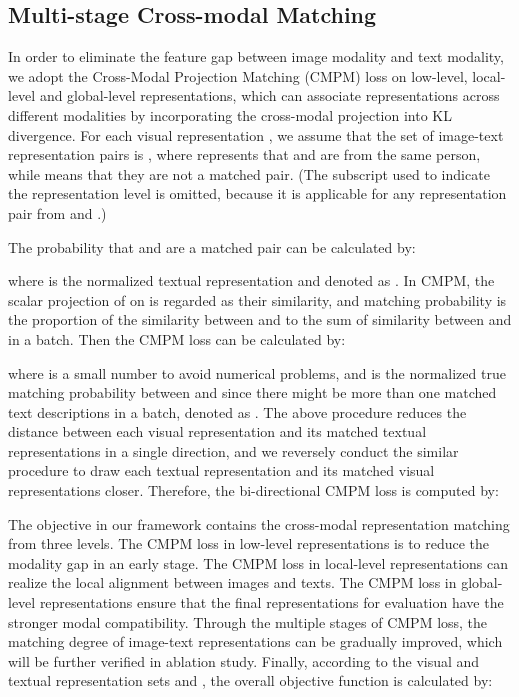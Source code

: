 \documentclass[review]{elsarticle}
\begin{document}
\subsection{Multi-stage Cross-modal Matching}
In order to eliminate the feature gap between image modality and text modality, we adopt the Cross-Modal Projection Matching (CMPM) loss \cite{14} on low-level, local-level and global-level representations, which can associate representations across different modalities by incorporating the cross-modal projection into KL divergence. For each visual representation , we assume that the set of image-text representation pairs is , where  represents that  and  are from the same person, while  means that they are not a matched pair. (The subscript used to indicate the representation level is omitted, because it is applicable for any representation pair from  and .)

The probability that  and  are a matched pair can be calculated by:

where  is the normalized textual representation and denoted as . In CMPM, the scalar projection of  on  is regarded as their similarity, and matching probability  is the proportion of the similarity between  and  to the sum of similarity between  and  in a batch. Then the CMPM loss can be calculated by:

where  is a small number to avoid numerical problems, and  is the normalized true matching probability between  and  since there might be more than one matched text descriptions in a batch, denoted as . The above procedure reduces the distance between each visual representation and its matched textual representations in a single direction, and we reversely conduct the similar procedure to draw each textual representation and its matched visual representations closer. Therefore, the bi-directional CMPM loss is computed by:


The objective in our framework contains the cross-modal representation matching from three levels. The CMPM loss in low-level representations is to reduce the modality gap in an early stage. The CMPM loss in local-level representations can realize the local alignment between images and texts. The CMPM loss in global-level representations ensure that the final representations for evaluation have the stronger modal compatibility. Through the multiple stages of CMPM loss, the matching degree of image-text representations can be gradually improved, which will be further verified in ablation study. Finally, according to the visual and textual representation sets  and , the overall objective function is calculated by:
\end{document}
